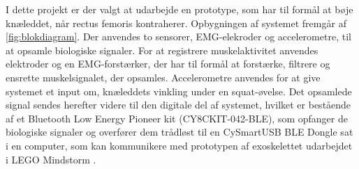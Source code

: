 I dette projekt er der valgt at udarbejde en prototype, som har til formål at bøje knæleddet, når rectus femoris kontraherer. Opbygningen af systemet fremgår af \autoref{fig:blokdiagram}. Der anvendes to sensorer, EMG-elekroder og accelerometre, til at opsamle biologiske signaler. 
For at registrere muskelaktivitet anvendes elektroder og en EMG-forstærker, der har til formål at forstærke, filtrere og ensrette muskelsignalet, der opsamles. 
Accelerometre anvendes for at give systemet et input om, knæleddets vinkling  under en squat-øvelse. 
Det opsamlede signal sendes herefter videre til den digitale del af systemet, hvilket er bestående af et Bluetooth Low Energy Pioneer kit (CY8CKIT-042-BLE), som opfanger de biologiske signaler og overfører dem trådløst til en CySmartUSB BLE Dongle sat i en computer, som kan kommunikere med prototypen af exoskelettet udarbejdet i LEGO Mindstorm . 


